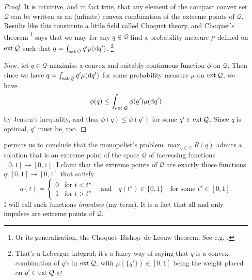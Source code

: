 \begin{proof}
	It is intuitive, and in fact true, that any element of the compact convex set $\mathcal{Q}$ can be written as an (infinite) convex combination of the extreme points of $\mathcal{Q}$.
	Results like this constitute a little field called Choquet theory,
	and Choquet's theorem%
		\footnote{Or its generalisation, the Choquet--Bishop--de Leeuw theorem. See e.g. \textcite{Phelps2001}.}
	says that
	we may for any $q \in \mathcal{Q}$ find a probability measure $\mu$ defined on $\operatorname*{ext} \mathcal{Q}$ such that $q = \int_{\operatorname*{ext} \mathcal{Q}} q' \mu(\mathrm{d} q')$.%
		\footnote{That's a Lebesgue integral;
		it's a fancy way of saying that $q$ is a convex combination of $q'$s in $\operatorname*{ext} \mathcal{Q}$, with $\mu(\{q'\}) \in [0,1]$ being the weight placed on $q' \in \operatorname*{ext} \mathcal{Q}$.}

	Now, let $q \in \mathcal{Q}$ maximise a convex and suitably continuous function $\phi$ on $\mathcal{Q}$.
	Then since we have $q = \int_{\operatorname*{ext} \mathcal{Q}} q' \mu(\mathrm{d} q')$ for some probability measure $\mu$ on $\operatorname*{ext} \mathcal{Q}$, we have
	\begin{equation*}
		\phi(q) \leq \int_{\operatorname*{ext} \mathcal{Q}} \phi(q') \mu(\mathrm{d} q') 
	\end{equation*}
	by Jensen's inequality,
	and thus $\phi(q) \leq \phi(q')$ for some $q' \in \operatorname*{ext} \mathcal{Q}$.
	Since $q$ is optimal, $q'$ must be, too.
\end{proof}


 permits us to conclude that the monopolist's problem $\max_{q \in \mathcal{Q}} R(q)$
admits a solution that is an extreme point of the space $\mathcal{Q}$ of increasing functions $[0,1] \to [0,1]$.
I claim that the extreme points of $\mathcal{Q}$
are exactly those functions
 $q : [0,1] \to [0,1]$
that satisfy
%
\begin{equation*}
	q(t) =
	\begin{cases}
		0	& \text{for $t<t^\star$} \\
		1	& \text{for $t>t^\star$} 
	\end{cases}
	\quad \text{and} \quad q(t^\star) \in \{0,1\}
	\quad
	\text{for some $t^\star \in [0,1]$.}
\end{equation*}
%
I will call such functions \emph{impulses} (my term).
It is a fact that all and only impulses are extreme points of $\mathcal{Q}$.

